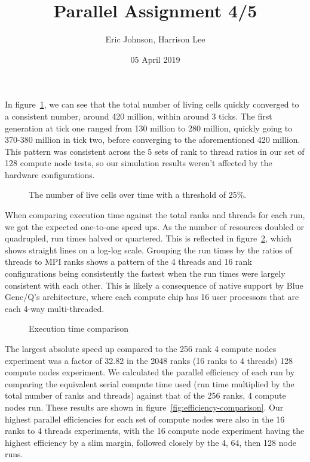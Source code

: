 \documentclass[12pt,letterpaper]{article}
\title{Parallel Assignment 4/5}
\author{Eric Johnson, Harrison Lee}
\date{05 April 2019}
\newlength\figureheight
\newlength\figurewidth
\begin{document}
\maketitle

In figure~\ref{fig:alive_ticks_graph}, we can see that the total number of living cells quickly converged to a consistent number, around 420 million, within around 3 ticks.
The first generation at tick one ranged from 130 million to 280 million, quickly going to 370-380 million in tick two, before converging to the aforementioned 420 million.
This pattern was consistent across the 5 sets of rank to thread ratios in our set of 128 compute node tests, so our simulation results weren't affected by the hardware configurations.

\begin{figure}[h]
    \centering
    \setlength\figureheight{3in}
    \setlength\figurewidth{5in}
    
    \caption{The number of live cells over time with a threshold of 25\%.}
    \label{fig:alive_ticks_graph}
\end{figure}

When comparing execution time against the total ranks and threads for each run, we got the expected one-to-one speed ups.
As the number of resources doubled or quadrupled, run times halved or quartered.
This is reflected in figure~\ref{fig:runtime-comparison}, which shows straight lines on a log-log scale.
Grouping the run times by the ratios of threads to MPI ranks shows a pattern of the 4 threads and 16 rank configurations being consistently the fastest when the run times were largely consistent with each other.
This is likely a consequence of native support by Blue Gene/Q's architecture, where each compute chip has 16 user processors that are each 4-way multi-threaded.
\begin{figure}[htb]
    \centering
    
    \caption{Execution time comparison}
    \label{fig:runtime-comparison}
\end{figure}

The largest absolute speed up compared to the 256 rank 4 compute nodes experiment was a factor of 32.82 in the 2048 ranks (16 ranks to 4 threads) 128 compute nodes experiment.
We calculated the parallel efficiency of each run by comparing the equivalent serial compute time used (run time multiplied by the total number of ranks and threads) against that of the 256 ranks, 4 compute nodes run.
These results are shown in figure~\ref{fig:efficiency-comparison}.
Our highest parallel efficiencies for each set of compute nodes were also in the 16 ranks to 4 threads experiments, with the 16 compute node experiment having the highest efficiency by a slim margin, followed closely by the 4, 64, then 128 node runs.
\end{document}
